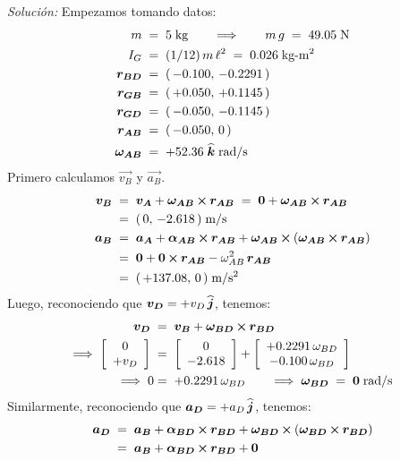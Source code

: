 \documentclass[ a4paper, twoside, 11pt]{article}
\begin{document}
\begin{problem}
\emph{Soluci\'on:} Empezamos tomando datos: 
\begin{align*}
m \; & = \; 5 \; \text{kg} \qquad \Longrightarrow \qquad
m \, g \; = \; 49.05 \; \text{N} \\
I_G \; & = \; (1/12) \, m \, \ell^2 \; = \; 0.026 \; \text{kg-m\ensuremath{^{\text{2}}}} \\
{\boldsymbol{r_{BD}}} \; & = \; ( \, -0.100, \, -0.2291 \, ) \\
{\boldsymbol{r_{GB}}} \; & = \; ( \, +0.050, \, +0.1145 \, ) \\
{\boldsymbol{r_{GD}}} \; & = \; ( \, -0.050, \, -0.1145 \, ) \\
{\boldsymbol{r_{AB}}} \; & = \; ( \, -0.050, \, 0 \, ) \\
{\boldsymbol{\omega_{AB}}} \; & = \; +52.36 \; {\boldsymbol{\widehat{k}}} \; \text{rad/s}
\end{align*}
Primero calculamos $\vec{v_B}$ y $\vec{a_B}$. 
\begin{align*}
{\boldsymbol{v_B}} \;
& = \; {\boldsymbol{v_A}} + {\boldsymbol{\omega_{AB}}} \,{\boldsymbol{\times}}\, {\boldsymbol{r_{AB}}}
\; = \; {\boldsymbol{0}} + {\boldsymbol{\omega_{AB}}} \,{\boldsymbol{\times}}\, {\boldsymbol{r_{AB}}} \\
& = \; ( \, 0, \, -2.618 \, ) \; \text{m/s} \\
{\boldsymbol{a_B}} \;
& = \; {\boldsymbol{a_A}} + {\boldsymbol{\alpha_{AB}}} \,{\boldsymbol{\times}}\, {\boldsymbol{r_{AB}}} + {\boldsymbol{\omega_{AB}}} \,{\boldsymbol{\times}}\, ( {\boldsymbol{\omega_{AB}}} \,{\boldsymbol{\times}}\, {\boldsymbol{r_{AB}}} ) \\
& = \; {\boldsymbol{0}} + {\boldsymbol{0}} \,{\boldsymbol{\times}}\, {\boldsymbol{r_{AB}}} - \omega_{AB}^2 \, {\boldsymbol{r_{AB}}} \\
& = \; ( \, +137.08, \, 0 \, ) \; \text{m/s\ensuremath{^{\text{2}}}}
\end{align*}
Luego, reconociendo que ${\boldsymbol{v_D}} = +v_D \, {\boldsymbol{\widehat{j}}}$, tenemos: 
\begin{align*}
{\boldsymbol{v_D}} \;
& = \; {\boldsymbol{v_B}} + {\boldsymbol{\omega_{BD}}} \,{\boldsymbol{\times}}\, {\boldsymbol{r_{BD}}} \\
\Longrightarrow \; \left[ \begin{array}{c} 0 \\ +v_D \end{array} \right] \;
& = \; \left[ \begin{array}{c} 0 \\ -2.618 \end{array} \right] +
\left[ \begin{array}{c}  +0.2291 \, \omega_{BD} \\  -0.100 \, \omega_{BD} \end{array} \right] \\
\Longrightarrow \; 0 & = \; +0.2291 \, \omega_{BD} \qquad
\Longrightarrow \; {\boldsymbol{\omega_{BD}}} \; = \; {\boldsymbol{0}} \; \text{rad/s}
\end{align*}
Similarmente, reconociendo que ${\boldsymbol{a_D}} = +a_D \, {\boldsymbol{\widehat{j}}}$, tenemos: 
\begin{align*}
\vec{a_D} \;
& = \; \vec{a_B} + \vec{\alpha_{BD}} \cross \vec{r_{BD}} + \vec{\omega_{BD}} \cross ( \vec{\omega_{BD}} \cross \vec{r_{BD}} ) \\
& = \; \vec{a_B} + \vec{\alpha_{BD}} \cross \vec{r_{BD}} + \vec{0} \\

\end{align*}
\end{problem}
\end{document}
